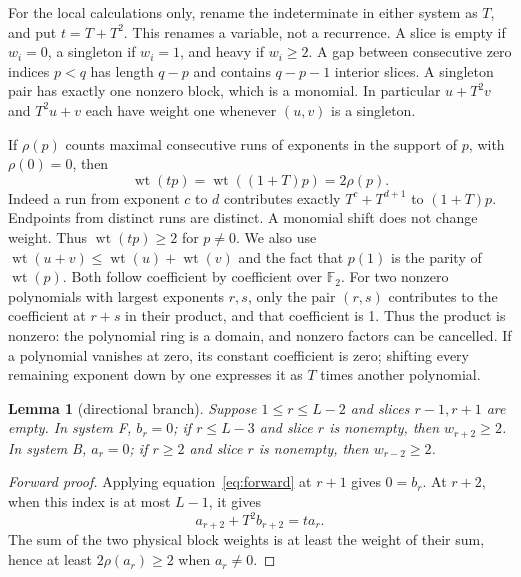\documentclass{article}
\newtheorem{lemma}{Lemma}
\DeclareMathOperator{\wt}{wt}
\begin{document}
For the local calculations only, rename the indeterminate in either system as \(T\), and put
\(t = T + T^2\). This renames a variable, not a recurrence. A slice is empty if \(w_i = 0\), a
singleton if \(w_i = 1\), and heavy if \(w_i \ge 2\). A gap between consecutive zero indices
\(p < q\) has length \(q - p\) and contains \(q - p - 1\) interior slices. A singleton pair has
exactly one nonzero block, which is a monomial. In particular \(u + T^2 v\) and \(T^2 u + v\) each
have weight one whenever \((u,v)\) is a singleton.

If \(\rho(p)\) counts maximal consecutive runs of exponents in the support of \(p\), with
\(\rho(0) = 0\), then
\begin{equation}\label{eq:runs}
  \wt(tp) = \wt((1 + T)p) = 2\rho(p).
\end{equation}
Indeed a run from exponent \(c\) to \(d\) contributes exactly \(T^c + T^{d+1}\) to \((1 + T)p\).
Endpoints from distinct runs are distinct. A monomial shift does not change weight. Thus
\(\wt(tp) \ge 2\) for \(p \ne 0\). We also use \(\wt(u + v) \le \wt(u) + \wt(v)\) and the fact
that \(p(1)\) is the parity of \(\wt(p)\). Both follow coefficient by coefficient over
\(\mathbb{F}_2\). For two nonzero polynomials with largest exponents \(r, s\), only the pair
\((r,s)\) contributes to the coefficient at \(r + s\) in their product, and that coefficient is 1.
Thus the product is nonzero: the polynomial ring is a domain, and nonzero factors can be
cancelled. If a polynomial vanishes at zero, its constant coefficient is zero; shifting every
remaining exponent down by one expresses it as \(T\) times another polynomial.

\begin{lemma}[directional branch]\label{lem:branch}
  Suppose \(1 \le r \le L-2\) and slices \(r - 1, r + 1\) are empty. In system F, \(b_r = 0\); if
  \(r \le L-3\) and slice \(r\) is nonempty, then \(w_{r+2} \ge 2\). In system B, \(a_r = 0\); if
  \(r \ge 2\) and slice \(r\) is nonempty, then \(w_{r-2} \ge 2\).
\end{lemma}

\begin{proof}[Forward proof]
  Applying equation~\eqref{eq:forward} at \(r + 1\) gives \(0 = b_r\). At \(r + 2\), when this
  index is at most \(L-1\), it gives
  \begin{equation}
    a_{r+2} + T^2 b_{r+2} = t a_r.
  \end{equation}
  The sum of the two physical block weights is at least the weight of their sum, hence at least
  \(2\rho(a_r) \ge 2\) when \(a_r \ne 0\).
\end{proof}
\end{document}
